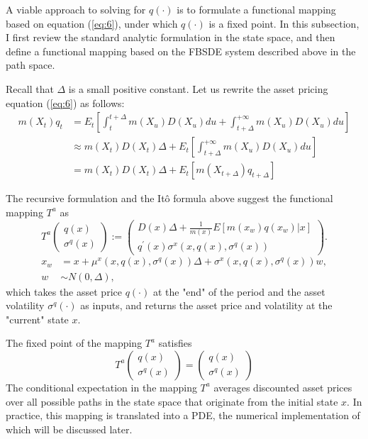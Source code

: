 \documentclass{article}
\begin{document}
A viable approach to solving for $q(\cdot)$ is to formulate a functional mapping based on equation (\ref{eq:6}), under which $q(\cdot)$ is a fixed point. In this subsection, I first review the standard analytic formulation in the state space, and then define a functional mapping based on the FBSDE system described above in the path space.

Recall that $\Delta$ is a small positive constant. Let us rewrite the asset pricing equation (\ref{eq:6}) as follows:
\begin{align*}
m(X_{t})q_{t}&=E_{t}\left[\int_{t}^{t+\Delta}m(X_{u})D(X_{u})du+\int_{t+\Delta}^{+\infty}m(X_{u})D(X_{u})du\right] \\
&\approx m(X_{t})D(X_{t})\Delta+E_{t}\left[\int_{t+\Delta}^{+\infty}m(X_{u})D(X_{u})du\right] \\
&=m(X_{t})D(X_{t})\Delta+E_{t}[m(X_{t+\Delta})q_{t+\Delta}]
\end{align*}

\clearpage

The recursive formulation and the Itô formula above suggest the functional mapping $T^{a}$ as
\[
T^{a}\begin{pmatrix}q(x)\\ \sigma^{q}(x)\end{pmatrix}:=\begin{pmatrix}D(x)\Delta+\frac{1}{m(x)}E[m(x_{w})q(x_{w})|x]\\ q^{\prime}(x)\sigma^{x}(x,q(x),\sigma^{q}(x))\end{pmatrix}.
\]
\begin{align*}
x_{w}&=x+\mu^{x}(x,q(x),\sigma^{q}(x))\Delta+\sigma^{x}(x,q(x),\sigma^{q}(x))w, \\
w&\sim N(0,\Delta),
\end{align*}
which takes the asset price $q(\cdot)$ at the "end" of the period and the asset volatility $\sigma^{q}(\cdot)$ as inputs, and returns the asset price and volatility at the "current" state $x$.

The fixed point of the mapping $T^{a}$ satisfies
\[
T^{a}\begin{pmatrix}q(x)\\ \sigma^{q}(x)\end{pmatrix}=\begin{pmatrix}q(x)\\ \sigma^{q}(x)\end{pmatrix}
\]
The conditional expectation in the mapping $T^{a}$ averages discounted asset prices over all possible paths in the state space that originate from the initial state $x$. In practice, this mapping is translated into a PDE, the numerical implementation of which will be discussed later.
\end{document}
